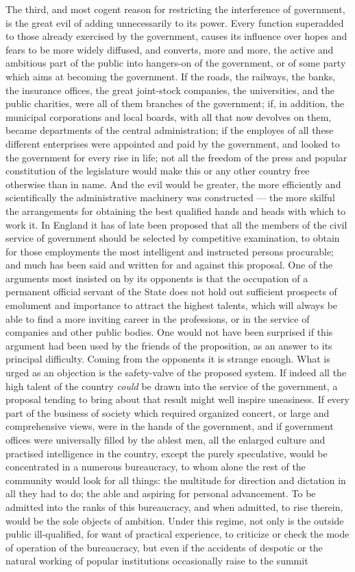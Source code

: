 \documentclass[12pt]{report}
\begin{document}
The third, and most cogent reason for restricting the interference of government, is the great evil of adding unnecessarily to its power. Every function superadded to those already exercised by the government, causes its influence over hopes and fears to be more widely diffused, and converts, more and more, the active and ambitious part of the public into hangers-on of the government, or of some party which aims at becoming the government. If the roads, the railways, the banks, the insurance offices, the great joint-stock companies, the universities, and the public charities, were all of them branches of the government; if, in addition, the municipal corporations and local boards, with all that now devolves on them, became departments of the central administration; if the employes of all these different enterprises were appointed and paid by the government, and looked to the government for every rise in life; not all the freedom of the press and popular constitution of the legislature would make this or any other country free otherwise than in name. And the evil would be greater, the more efficiently and scientifically the administrative machinery was constructed — the more skilful the arrangements for obtaining the best qualified hands and heads with which to work it. In England it has of late been proposed that all the members of the civil service of government should be selected by competitive examination, to obtain for those employments the most intelligent and instructed persons procurable; and much has been said and written for and against this proposal. One of the arguments most insisted on by its opponents is that the occupation of a permanent official servant of the State does not hold out sufficient prospects of emolument and importance to attract the highest talents, which will always be able to find a more inviting career in the professions, or in the service of companies and other public bodies. One would not have been surprised if this argument had been used by the friends of the proposition, as an answer to its principal difficulty. Coming from the opponents it is strange enough. What is urged as an objection is the safety-valve of the proposed system. If indeed all the high talent of the country \emph{could} be drawn into the service of the government, a proposal tending to bring about that result might well inspire uneasiness. If every part of the business of society which required organized concert, or large and comprehensive views, were in the hands of the government, and if government offices were universally filled by the ablest men, all the enlarged culture and practised intelligence in the country, except the purely speculative, would be concentrated in a numerous bureaucracy, to whom alone the rest of the community would look for all things: the multitude for direction and dictation in all they had to do; the able and aspiring for personal advancement. To be admitted into the ranks of this bureaucracy, and when admitted, to rise therein, would be the sole objects of ambition. Under this regime, not only is the outside public ill-qualified, for want of practical experience, to criticize or check the mode of operation of the bureaucracy, but even if the accidents of despotic or the natural working of popular institutions occasionally raise to the summit 
\end{document}
